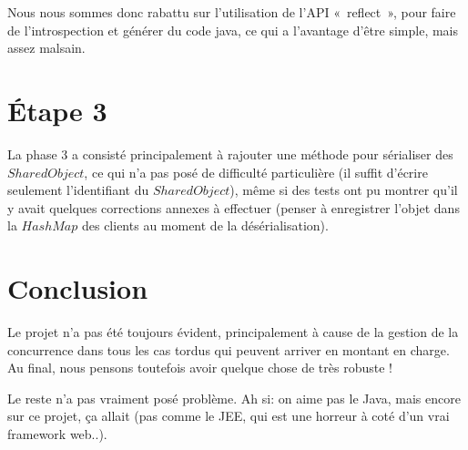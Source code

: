 \documentclass[11pt,a4paper]{article}
\begin{document}
Nous nous sommes donc rabattu sur l'utilisation de l'API «~reflect~», pour faire de l'introspection et générer du code java, ce qui a l'avantage
d'être simple, mais assez malsain.

\section{Étape 3}

La phase 3 a consisté principalement à rajouter une méthode pour sérialiser des $SharedObject$, ce qui n'a pas posé de difficulté
particulière (il suffit d'écrire seulement l'identifiant du $SharedObject$), même si des tests ont pu montrer qu'il y avait quelques corrections annexes à effectuer
(penser à enregistrer l'objet dans la $HashMap$ des clients au moment de la désérialisation).

\section{Conclusion}

Le projet n'a pas été toujours évident, principalement à cause de la gestion de la concurrence dans tous les cas tordus
qui peuvent arriver en montant en charge. Au final, nous pensons toutefois avoir quelque chose de très robuste !

Le reste n'a pas vraiment posé problème. Ah si: on aime pas le Java, mais encore sur ce projet, ça allait (pas comme le JEE, qui est une horreur à coté d'un vrai framework web..).
\end{document}

